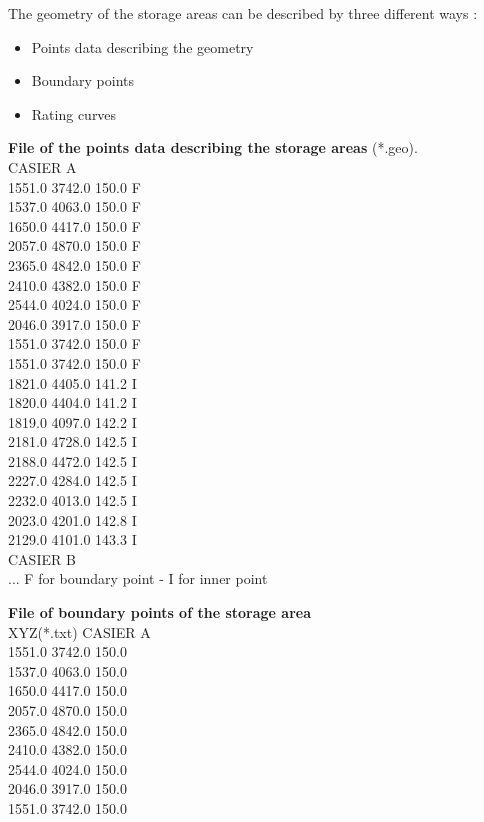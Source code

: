 \documentclass[a4paper,12pt]{article}
\begin{document}
The geometry of the storage areas can be described by three different ways : 
\begin{itemize}
\item{Points data describing the geometry} 
\item{Boundary points}
\item{Rating curves}
\end{itemize}
\vspace{0.5cm}
\textbf{File of the points data describing the storage areas} (*.geo).\\
CASIER A\\
1551.0 3742.0 150.0 F\\
1537.0 4063.0 150.0 F\\
1650.0 4417.0 150.0 F\\
2057.0 4870.0 150.0 F\\
2365.0 4842.0 150.0 F \\ 
2410.0 4382.0 150.0 F\\
2544.0 4024.0 150.0 F\\
2046.0 3917.0 150.0 F\\
1551.0 3742.0 150.0 F\\
1551.0 3742.0 150.0 F\\
1821.0 4405.0 141.2 I\\
1820.0 4404.0 141.2 I\\
1819.0 4097.0 142.2 I\\
2181.0 4728.0 142.5 I\\
2188.0 4472.0 142.5 I\\
2227.0 4284.0 142.5 I\\
2232.0 4013.0 142.5 I\\
2023.0 4201.0 142.8 I\\
2129.0 4101.0 143.3 I\\
CASIER B\\
...
F for boundary point - I for inner point

\vspace{0.5cm}
\textbf{File of boundary points of the storage area} \\
XYZ(*.txt)
CASIER A\\
1551.0 3742.0 150.0\\ 
1537.0 4063.0 150.0 \\
1650.0 4417.0 150.0 \\
2057.0 4870.0 150.0 \\
2365.0 4842.0 150.0 \\
2410.0 4382.0 150.0 \\
2544.0 4024.0 150.0\\ 
2046.0 3917.0 150.0 \\
1551.0 3742.0 150.0 \\
 
\end{document}

